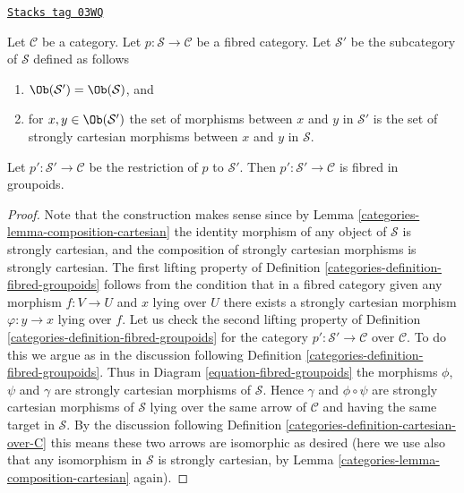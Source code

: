 \begin{lemma}
\label{categories-lemma-fibred-gives-fibred-groupoids}
\href{https://stacks.math.columbia.edu/tag/03WQ}{\texttt{Stacks tag 03WQ}}

Let $\mathcal{C}$ be a category.
Let $p : \mathcal{S} \to \mathcal{C}$ be a fibred category.
Let $\mathcal{S}'$ be the subcategory of $\mathcal{S}$ defined
as follows
\begin{enumerate}
\item $\Ob(\mathcal{S}') = \Ob(\mathcal{S})$, and
\item for $x, y \in \Ob(\mathcal{S}')$ the set of morphisms between $x$
and $y$ in $\mathcal{S}'$ is the set of strongly cartesian morphisms between
$x$ and $y$ in $\mathcal{S}$.
\end{enumerate}
Let $p' : \mathcal{S}' \to \mathcal{C}$ be the restriction of $p$
to $\mathcal{S}'$. Then $p' : \mathcal{S}' \to \mathcal{C}$ is fibred
in groupoids.
\end{lemma}

\begin{proof}

Note that the construction makes sense since by
Lemma \ref{categories-lemma-composition-cartesian}
the identity morphism of any object of $\mathcal{S}$ is strongly cartesian,
and the composition of strongly cartesian morphisms is strongly cartesian.
The first lifting property of
Definition \ref{categories-definition-fibred-groupoids}
follows from the condition that in a fibred category
given any morphism $f : V \to U$ and $x$ lying over $U$ there exists
a strongly cartesian morphism $\varphi : y \to x$ lying over $f$.
Let us check the second lifting property of
Definition \ref{categories-definition-fibred-groupoids}
for the category $p' : \mathcal{S}' \to \mathcal{C}$ over $\mathcal{C}$.
To do this we argue as in the discussion following
Definition \ref{categories-definition-fibred-groupoids}.
Thus in Diagram \ref{equation-fibred-groupoids} the
morphisms $\phi$, $\psi$ and $\gamma$ are strongly cartesian morphisms
of $\mathcal{S}$.
Hence $\gamma$ and $\phi \circ \psi$ are strongly cartesian morphisms
of $\mathcal{S}$ lying over the same arrow of $\mathcal{C}$ and
having the same target in $\mathcal{S}$. By the discussion following
Definition \ref{categories-definition-cartesian-over-C}
this means these two arrows are isomorphic as desired (here we use also
that any isomorphism in $\mathcal{S}$ is strongly cartesian, by
Lemma \ref{categories-lemma-composition-cartesian} again).
\end{proof}

